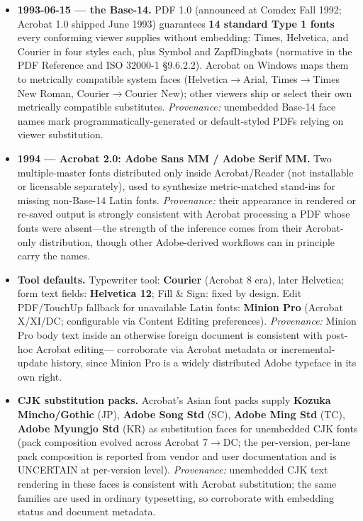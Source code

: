 \documentclass[10pt,a4paper]{article}
\begin{document}
\begin{itemize}[leftmargin=1.2em,itemsep=2pt]
\item \textbf{1993-06-15 --- the Base-14.} PDF 1.0 (announced at Comdex Fall 1992;
Acrobat 1.0 shipped June 1993) guarantees \textbf{14 standard Type 1 fonts} every
conforming viewer supplies without embedding: Times, Helvetica, and Courier in four
styles each, plus Symbol and ZapfDingbats (normative in the PDF Reference and ISO
32000-1 \S9.6.2.2). Acrobat on Windows maps them to metrically compatible system
faces (Helvetica$\rightarrow$Arial, Times$\rightarrow$Times New Roman,
Courier$\rightarrow$Courier New); other viewers ship or select their own metrically
compatible substitutes.
\emph{Provenance:} unembedded Base-14 face names mark programmatically-generated or
default-styled PDFs relying on viewer
substitution.\cite{p-base14,p-base14-2,p-base14-3,p-history,p-history-2}
\item \textbf{1994 --- Acrobat 2.0: Adobe Sans MM / Adobe Serif MM.} Two multiple-master
fonts distributed only inside Acrobat/Reader (not installable or licensable separately),
used to synthesize metric-matched stand-ins for missing non-Base-14 Latin fonts.
\emph{Provenance:} their appearance in rendered or re-saved output is strongly consistent
with Acrobat processing a PDF whose fonts were absent---the strength of the inference
comes from their Acrobat-only distribution, though other Adobe-derived workflows can in
principle carry the names.\cite{p-mm,p-mm-2}
\item \textbf{Tool defaults.} Typewriter tool: \textbf{Courier} (Acrobat 8 era), later
Helvetica; form text fields: \textbf{Helvetica 12}; Fill \& Sign: fixed by design. Edit
PDF/TouchUp fallback for unavailable Latin fonts: \textbf{Minion Pro} (Acrobat X/XI/DC;
configurable via Content Editing preferences). \emph{Provenance:} Minion Pro body text
inside an otherwise foreign document is consistent with post-hoc Acrobat editing---
corroborate via Acrobat metadata or incremental-update history, since Minion Pro is a
widely distributed Adobe typeface in its own right.\cite{p-tools,p-tools-2,p-minion,p-minion-2}
\item \textbf{CJK substitution packs.} Acrobat's Asian font packs supply \textbf{Kozuka
Mincho/Gothic} (JP), \textbf{Adobe Song Std} (SC), \textbf{Adobe Ming Std} (TC),
\textbf{Adobe Myungjo Std} (KR) as substitution faces for unembedded CJK fonts (pack
composition evolved across Acrobat 7$\rightarrow$DC; the per-version, per-lane pack
composition is reported from vendor and user documentation and is UNCERTAIN at
per-version level). \emph{Provenance:} unembedded CJK text rendering in these faces is
consistent with Acrobat substitution; the same families are used in ordinary
typesetting, so corroborate with embedding status and document metadata.\cite{p-cjk,p-cjk-2,p-cjk-3}
\end{itemize}
\end{document}
